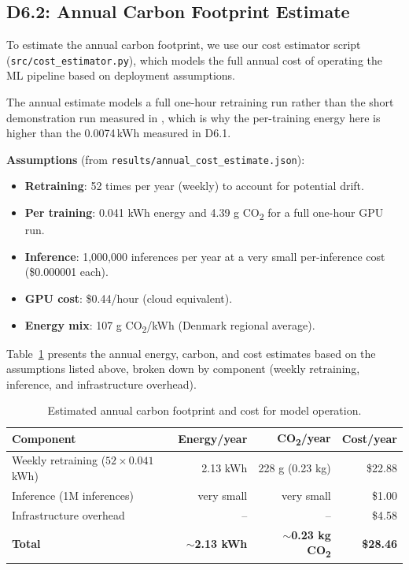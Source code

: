 \documentclass[10pt,twocolumn,letterpaper]{article}
\begin{document}
\subsection{D6.2: Annual Carbon Footprint Estimate}

To estimate the annual carbon footprint, we use our cost estimator script (\texttt{src/cost\_estimator.py}), which models the full annual cost of operating the ML pipeline based on deployment assumptions.

The annual estimate models a full one-hour retraining run rather than the short demonstration run measured in , which is why the per-training energy here is higher than the 0.0074\,kWh measured in D6.1.

\textbf{Assumptions} (from \texttt{results/annual\_cost\_estimate.json}):
\begin{itemize}
    \item \textbf{Retraining}: 52 times per year (weekly) to account for potential drift.
    \item \textbf{Per training}: 0.041 kWh energy and 4.39 g CO\textsubscript{2} for a full one-hour GPU run.
    \item \textbf{Inference}: 1{,}000{,}000 inferences per year at a very small per-inference cost (\$0.000001 each).
    \item \textbf{GPU cost}: \$0.44/hour (cloud equivalent).
    \item \textbf{Energy mix}: 107 g CO\textsubscript{2}/kWh (Denmark regional average).
\end{itemize}

Table~\ref{tab:annual-carbon} presents the annual energy, carbon, and cost estimates based on the assumptions listed above, broken down by component (weekly retraining, inference, and infrastructure overhead).

\begin{table}[h]
\centering
\caption{Estimated annual carbon footprint and cost for model operation.}
\label{tab:annual-carbon}
\begin{tabular}{@{} l r r r @{}}
\toprule
\textbf{Component} & \textbf{Energy/year} & \textbf{CO\textsubscript{2}/year} & \textbf{Cost/year} \\
\midrule
Weekly retraining ($52 \times 0.041$ kWh) & 2.13 kWh & 228 g (0.23 kg) & \$22.88 \\
Inference (1M inferences) & very small & very small & \$1.00 \\
Infrastructure overhead & -- & -- & \$4.58 \\
\midrule
\textbf{Total} & \textbf{$\sim$2.13 kWh} & \textbf{$\sim$0.23 kg CO\textsubscript{2}} & \textbf{\$28.46} \\
\bottomrule
\end{tabular}
\end{table}
\end{document}
